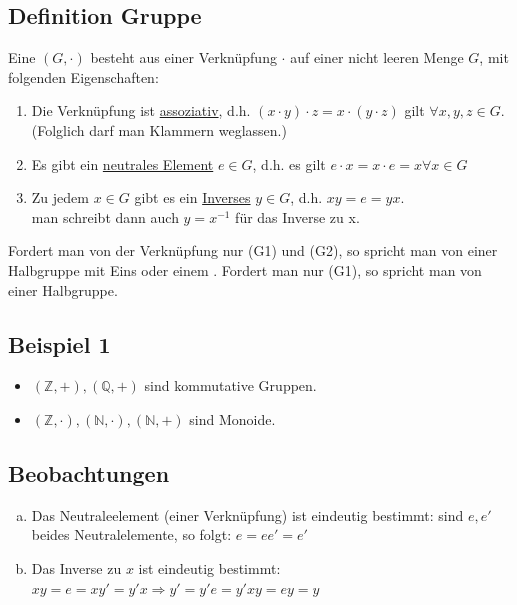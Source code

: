 \subsection{Definition Gruppe}
\label{sub: gef_gruppe}
Eine  $(G,\cdot )$ besteht aus einer Verknüpfung $\cdot $ auf einer nicht leeren Menge $G$, mit folgenden Eigenschaften:
\begin{enumerate}[(G1)]
	\item Die Verknüpfung ist \uline{assoziativ}, d.h. $(x\cdot y)\cdot z = x \cdot (y \cdot z)$ gilt $\forall x,y,z \in G$.\\ 
	(Folglich darf man Klammern weglassen.)
	\item Es gibt ein \uline{neutrales Element} $e \in G$, d.h. es gilt $e\cdot x= x\cdot e= x \forall x\in G$
	\item Zu jedem $x\in G$ gibt es ein \uline{Inverses} $y \in G$, d.h. $xy=e=yx.$\\
	man schreibt dann auch $y=x^{-1}$ für das Inverse zu x.
\end{enumerate}
Fordert man von der Verknüpfung nur (G1) und (G2), so spricht man von einer Halbgruppe mit Eins oder einem . Fordert man nur (G1), so spricht man von einer Halbgruppe.\\

\subsection{Beispiel 1}
\label{sub:beispiel_1}
\begin{itemize}
	\item $(\mathds{Z}, +), (\mathds{Q}, +)$ sind kommutative Gruppen.
	\item $(\mathds{Z},\cdot), (\mathds{N},\cdot), (\mathds{N}, +)$ sind Monoide.
\end{itemize}

\subsection{Beobachtungen}
\label{sub: beobachtungen}
\begin{enumerate}[a)]
	\item Das Neutraleelement (einer Verknüpfung) ist eindeutig bestimmt: sind $e,e'$ beides Neutralelemente, so folgt: $e=ee'=e'$
	\item Das Inverse zu $x$ ist eindeutig bestimmt:\\
	$xy=e=xy'=y'x \Rightarrow y'=y'e=y'xy=ey=y$
\end{enumerate}

